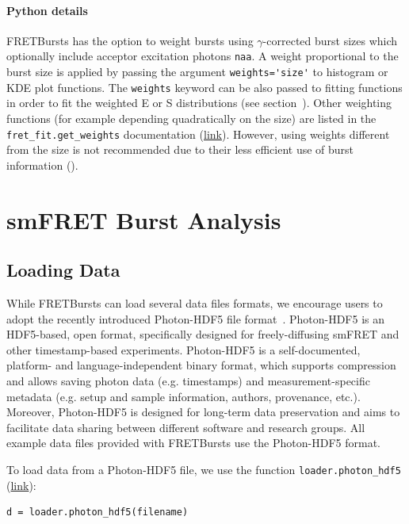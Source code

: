 \documentclass[10pt,letterpaper]{article}
\begin{document}
\paragraph*{Python details}
FRETBursts has the option to weight bursts using $\gamma$-corrected
burst sizes which optionally include acceptor excitation photons \verb|naa|.
A weight proportional to the burst size is applied by passing the argument
\verb|weights='size'| to histogram or KDE plot functions. The \verb|weights|
keyword can be also passed to fitting functions in order to fit
the weighted E or S distributions (see section~).
Other weighting functions (for example depending quadratically on the size)
are listed in the \verb|fret_fit.get_weights| documentation
(\href{http://fretbursts.readthedocs.org/en/latest/fret_fit.html#fretbursts.fret_fit.get_weights}{link}).
However, using weights different from the size is not recommended
due to their less efficient use of burst information 
().

\section*{smFRET Burst Analysis}
\label{sec:analysis}

\subsection*{Loading Data}
\label{sec:dataload}
While FRETBursts can load several data files formats,
we encourage users to adopt the recently introduced Photon-HDF5
file format~\cite{Ingargiola2016}.
Photon-HDF5 is an HDF5-based, open format, specifically designed
for freely-diffusing smFRET and
other timestamp-based experiments.
Photon-HDF5 is a self-documented, platform- and language-independent binary format,
which supports compression and allows saving photon data (e.g. timestamps)
and measurement-specific metadata
(e.g. setup and sample information, authors, provenance, etc.).
Moreover, Photon-HDF5 is designed for long-term data preservation and aims
to facilitate data sharing
between different software and research groups.
All example data files provided with FRETBursts use the Photon-HDF5 format.

To load data from a Photon-HDF5 file, we use the function \verb|loader.photon_hdf5|
(\href{http://fretbursts.readthedocs.org/en/latest/loader.html#fretbursts.loader.photon_hdf5}{link}):

\begin{lstlisting}
d = loader.photon_hdf5(filename)
\end{lstlisting}
\end{document}
